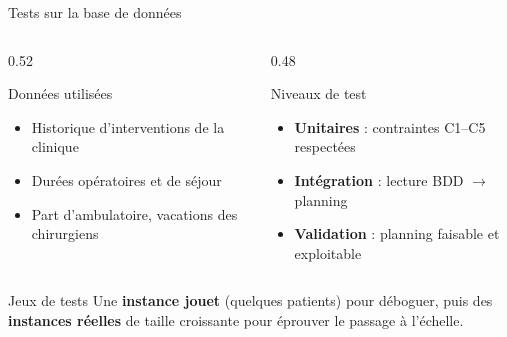 \begin{frame}{Tests sur la base de données}
  \small
  \begin{columns}[T]
    \begin{column}{0.52\textwidth}
      \begin{block}{Données utilisées}
        \begin{itemize}
          \item Historique d'interventions de la clinique
          \item Durées opératoires et de séjour
          \item Part d'ambulatoire, vacations des chirurgiens
        \end{itemize}
      \end{block}
    \end{column}
    \begin{column}{0.48\textwidth}
      \begin{block}{Niveaux de test}
        \begin{itemize}
          \item \textbf{Unitaires} : contraintes C1--C5 respectées
          \item \textbf{Intégration} : lecture BDD $\rightarrow$ planning
          \item \textbf{Validation} : planning faisable et exploitable
        \end{itemize}
      \end{block}
    \end{column}
  \end{columns}
  \vspace{0.3em}
  \begin{exampleblock}{\footnotesize Jeux de tests}
    \footnotesize Une \textbf{instance jouet} (quelques patients) pour
    déboguer, puis des \textbf{instances réelles} de taille croissante pour
    éprouver le passage à l'échelle.
  \end{exampleblock}
\end{frame}


